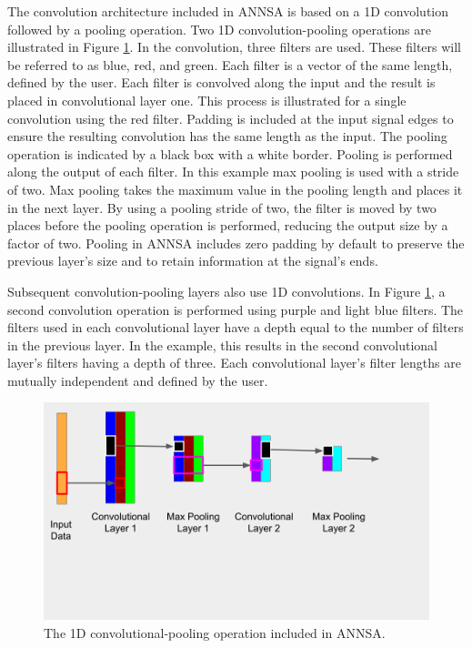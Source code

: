 The convolution architecture included in ANNSA is based on a 1D convolution followed by a pooling operation. Two 1D convolution-pooling operations are illustrated in Figure \ref{fig:annsa_cnn_fine}. In the convolution, three filters are used. These filters will be referred to as blue, red, and green. Each filter is a vector of the same length, defined by the user. Each filter is convolved along the input and the result is placed in convolutional layer one. This process is illustrated for a single convolution using the red filter. Padding is included at the input signal edges to ensure the resulting convolution has the same length as the input. The pooling operation is indicated by a black box with a white border. Pooling is performed along the output of each filter. In this example max pooling is used with a stride of two. Max pooling takes the maximum value in the pooling length and places it in the next layer. By using a pooling stride of two, the filter is moved by two places before the pooling operation is performed, reducing the output size by a factor of two. Pooling in ANNSA includes zero padding by default to preserve the previous layer's size and to retain information at the signal's ends.

Subsequent convolution-pooling layers also use 1D convolutions. In Figure \ref{fig:annsa_cnn_fine}, a second convolution operation is performed using purple and light blue filters. The filters used in each convolutional layer have a depth equal to the number of filters in the previous layer. In the example, this results in the second convolutional layer's filters having a depth of three. Each convolutional layer's filter lengths are mutually independent and defined by the user.

\begin{figure}[H]
\centering
\includegraphics[trim=0 150 60 0,clip,width=0.8\linewidth]{images/annsa_cnn_fine.png}
\caption{The 1D convolutional-pooling operation included in ANNSA.}
\label{fig:annsa_cnn_fine}
\end{figure}

